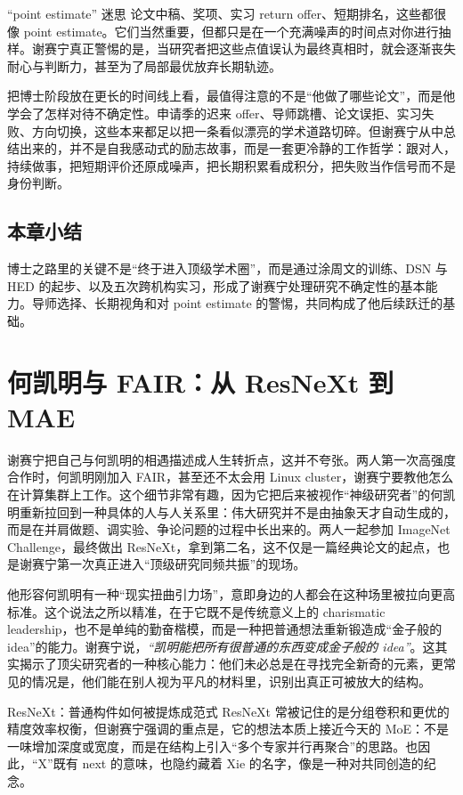 \documentclass[a4paper,12pt]{article}
\begin{document}
\begin{warningbox}{“point estimate” 迷思}
论文中稿、奖项、实习 return offer、短期排名，这些都很像 point estimate。它们当然重要，但都只是在一个充满噪声的时间点对你进行抽样。谢赛宁真正警惕的是，当研究者把这些点值误认为最终真相时，就会逐渐丧失耐心与判断力，甚至为了局部最优放弃长期轨迹。
\end{warningbox}

把博士阶段放在更长的时间线上看，最值得注意的不是“他做了哪些论文”，而是他学会了怎样对待不确定性。申请季的迟来 offer、导师跳槽、论文误拒、实习失败、方向切换，这些本来都足以把一条看似漂亮的学术道路切碎。但谢赛宁从中总结出来的，并不是自我感动式的励志故事，而是一套更冷静的工作哲学：跟对人，持续做事，把短期评价还原成噪声，把长期积累看成积分，把失败当作信号而不是身份判断。

\subsection{本章小结}

博士之路里的关键不是“终于进入顶级学术圈”，而是通过涂周文的训练、DSN 与 HED 的起步、以及五次跨机构实习，形成了谢赛宁处理研究不确定性的基本能力。导师选择、长期视角和对 point estimate 的警惕，共同构成了他后续跃迁的基础。

\section{何凯明与 FAIR：从 ResNeXt 到 MAE}

谢赛宁把自己与何凯明的相遇描述成人生转折点，这并不夸张。两人第一次高强度合作时，何凯明刚加入 FAIR，甚至还不太会用 Linux cluster，谢赛宁要教他怎么在计算集群上工作。这个细节非常有趣，因为它把后来被视作“神级研究者”的何凯明重新拉回到一种具体的人与人关系里：伟大研究并不是由抽象天才自动生成的，而是在并肩做题、调实验、争论问题的过程中长出来的。两人一起参加 ImageNet Challenge，最终做出 ResNeXt，拿到第二名，这不仅是一篇经典论文的起点，也是谢赛宁第一次真正进入“顶级研究同频共振”的现场。

他形容何凯明有一种“现实扭曲引力场”，意即身边的人都会在这种场里被拉向更高标准。这个说法之所以精准，在于它既不是传统意义上的 charismatic leadership，也不是单纯的勤奋楷模，而是一种把普通想法重新锻造成“金子般的 idea”的能力。谢赛宁说，\textit{``凯明能把所有很普通的东西变成金子般的 idea''}。这其实揭示了顶尖研究者的一种核心能力：他们未必总是在寻找完全新奇的元素，更常见的情况是，他们能在别人视为平凡的材料里，识别出真正可被放大的结构。

\begin{importantbox}{ResNeXt：普通构件如何被提炼成范式}
ResNeXt 常被记住的是分组卷积和更优的精度效率权衡，但谢赛宁强调的重点是，它的想法本质上接近今天的 MoE：不是一味增加深度或宽度，而是在结构上引入“多个专家并行再聚合”的思路。也因此，“X”既有 next 的意味，也隐约藏着 Xie 的名字，像是一种对共同创造的纪念。
\end{importantbox}
\end{document}
